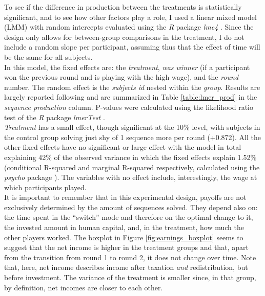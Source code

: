 To see if the difference in production between the treatments is statistically significant, and to see how other factors play a role, I used a linear mixed model (LMM) with random intercepts evaluated using the \textit{R} package \textit{lme4} \citep{bates2015}. Since the design only allows for between-group comparisons in the treatment, I do not include a random slope per participant, assuming thus that the effect of time will be the same for all subjects.\\

In this model, the fixed effects are: the \textit{treatment}, \textit{was winner} (if a participant won the previous round and is playing with the high wage), and the \textit{round} number. The random effect is the \textit{subjects id} nested within the \textit{group}. Results are largely reported following \cite{barr2013} and are summarized in Table \ref{table:lmer_prod} in the \textit{sequence production} column. P-values were calculated using the likelihood ratio test of the \textit{R} package \textit{lmerTest} \citep{kuznetsova2017}.\\

\textit{Treatment} has a small effect, though significant at the 10\% level, with subjects in the control group solving just shy of 1 sequence more per round (+0.872). All the other fixed effects have no significant or large effect with the model in total explaining 42\% of the observed variance in which the fixed effects explain 1.52\% (conditional R-squared and marginal R-squared respectively, calculated using the \textit{psycho} package \citep{makowski2018}). The variables with no effect include, interestingly, the wage at which participants played.\\


It is important to remember that in this experimental design, payoffs are not exclusively determined by the amount of sequences solved. They depend also on: the time spent in the ``switch'' mode and therefore on the optimal change to it, the invested amount in human capital, and, in the treatment, how much the other players worked. The boxplot in Figure \ref{fig:earnings_boxplot} seems to suggest that the net income is higher in the treatment groups and that, apart from the transition from round 1 to round 2, it does not change over time. Note that, here, net income describes income after taxation \textit{and} redistribution, but before investment. The variance of the treatment is smaller since, in that group, by definition, net incomes are closer to each other.\\

